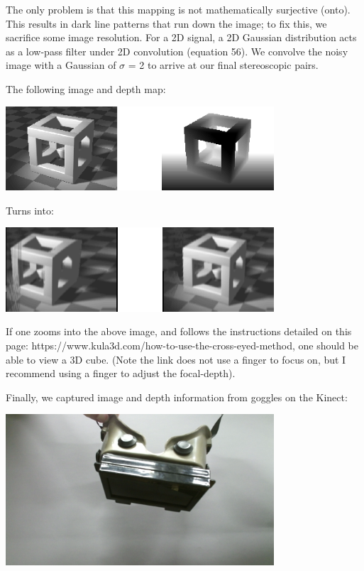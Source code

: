 \documentclass[12pt]{article}
\begin{document}
The only problem is that this mapping is not mathematically surjective (onto). This results in dark line patterns that run down the image; to fix this, we sacrifice some image resolution. For a 2D signal, a 2D Gaussian distribution acts as a low-pass filter under 2D convolution (equation 56). We convolve the noisy image with a Gaussian of \(\sigma\) = 2 to arrive at our final stereoscopic pairs.

The following image and depth map:

\begin{center}
\includegraphics[width=100mm]{image_depth_pair.png}
\end{center}

Turns into:

\begin{center}
\includegraphics[width=100mm]{stereoscopic_pair.png}
\end{center}

If one zooms into the above image, and follows the instructions detailed on this page: https://www.kula3d.com/how-to-use-the-cross-eyed-method, one should be able to view a 3D cube. (Note the link does not use a finger to focus on, but I recommend using a finger to adjust the focal-depth).

Finally, we captured image and depth information from goggles on the Kinect:

\begin{center}
\includegraphics[width=100mm]{goggles.png}
\end{center}
\end{document}
